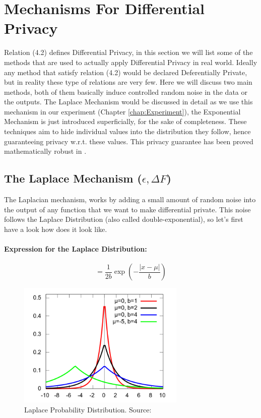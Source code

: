 \documentclass[12pt]{report}
\theoremstyle{named}
\begin{document}
\section{Mechanisms For Differential Privacy}
Relation (4.2) defines Differential Privacy, in this section we will list some of the methods that are used to actually apply Differential Privacy in real world. Ideally any method that satisfy relation (4.2) would be declared Deferentially Private, but in reality these type of relations are very few. Here we will discuss two main methods, both of them basically induce controlled random noise in the data or the outputs. The Laplace Mechanism would be discussed in detail as we use this mechanism in our experiment (Chapter \ref{chap:Experiment}), the Exponential Mechanism is just introduced superficially, for the sake of completeness.  These techniques aim to hide individual values into the distribution they follow, hence guaranteeing privacy w.r.t. these values. This privacy guarantee has been proved mathematically robust in \cite{dwork2014algorithmic}.

\subsection{The Laplace Mechanism ($\epsilon, \Delta F$)}
\label{sec:LaplaceMecha}
The Laplacian mechanism, works by adding a small amount of random noise into the output of any function that we want to make differential private. This noise follows the Laplace Distribution (also called double-exponential), so let's first have a look how does it look like.

\paragraph{Expression for the Laplace Distribution:\\}
\begin{equation}
=\frac{1}{2b} \exp(-\frac{\left | x-\mu  \right |}{b})
\end{equation}
\begin{figure}[ht]
\centering
        \includegraphics[width=80mm,scale=1]{Images/LaplaceDistribution.png}
    \caption{Laplace Probability Distribution. Source:\cite{LaplaceDist}}
    \label{fig:laplace}
\end{figure}
\end{document}
